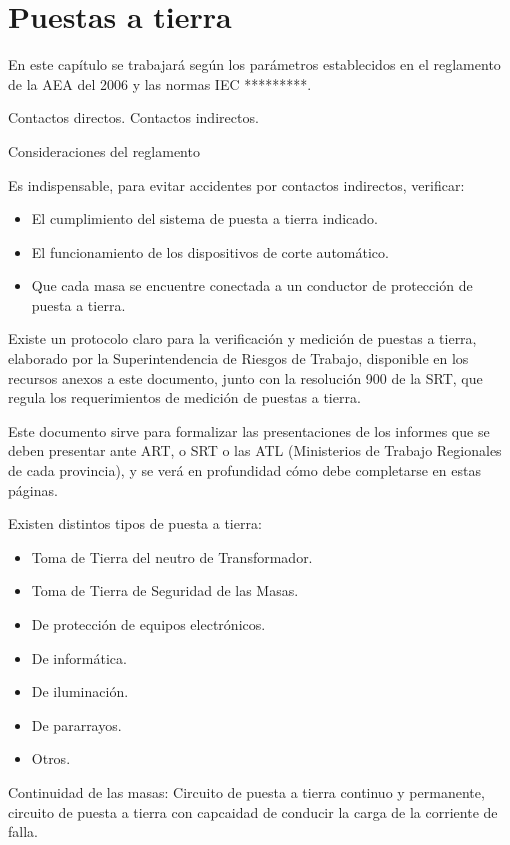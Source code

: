 
\chapter{Puestas a tierra}

En este capítulo se trabajará según los parámetros establecidos en el reglamento de la AEA del 2006 y las normas IEC *********.

Contactos directos.
Contactos indirectos.

Consideraciones del reglamento

Es indispensable, para evitar accidentes por contactos indirectos, verificar:
\begin{itemize}
	\item El cumplimiento del sistema de puesta a tierra indicado.
	\item El funcionamiento de los dispositivos de corte automático.
	\item Que cada masa se encuentre conectada a un conductor de protección de puesta a tierra.
\end{itemize}

Existe un protocolo claro para la verificación y medición de puestas a tierra, elaborado por la Superintendencia de Riesgos de Trabajo, disponible en los recursos anexos a este documento, junto con la resolución 900 de la SRT, que regula los requerimientos de medición de puestas a tierra.

Este documento sirve para formalizar las presentaciones de los informes que se deben presentar ante ART, o SRT o las ATL (Ministerios de Trabajo Regionales de cada provincia), y se verá en profundidad cómo debe completarse en estas páginas.

Existen distintos tipos de puesta a tierra:
\begin{itemize}
	\item Toma de Tierra del neutro de Transformador.
	\item Toma de Tierra de Seguridad de las Masas.
	\item De protección de equipos electrónicos.
	\item De informática.
	\item De iluminación.
	\item De pararrayos.
	\item Otros.
\end{itemize}

Continuidad de las masas: Circuito de puesta a tierra continuo y permanente, circuito de puesta a tierra con capcaidad de conducir la carga de la corriente de falla.

